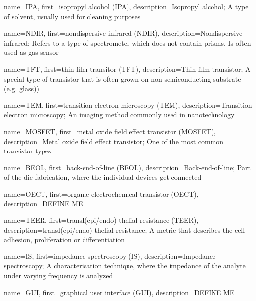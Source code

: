 {
    name={IPA},
    first={isopropyl alcohol (IPA)},
    description={Isopropyl alcohol; A type of solvent, usually used for cleaning purposes}
}

{
    name={NDIR},
    first={nondispersive infrared (NDIR)},
    description={Nondispersive infrared; Refers to a type of spectrometer which does not contain prisms. Is often used as gas sensor}
}

{
    name={TFT},
    first={thin film transitor (TFT)},
    description={Thin film transistor; A special type of transistor that is often grown on non-semiconducting substrate (e.g. glass))}
}

{
    name={TEM},
    first={transition electron microscopy (TEM)},
    description={Transition electron microscopy; An imaging method commonly used in nanotechnology}
}

{
    name={MOSFET},
    first={metal oxide field effect transistor (MOSFET)},
    description={Metal oxide field effect transistor; One of the most common transistor types}
}

{
    name={BEOL},
    first={back-end-of-line (BEOL)},
    description={Back-end-of-line; Part of the die fabrication, where the individual devices get connected}
}


{
    name={OECT},
    first={organic electrochemical transistor (OECT)},
    description={DEFINE ME}
}

{
    name={TEER},
    first={transI(epi/endo)-thelial resistance (TEER)},
    description={transI(epi/endo)-thelial resistance; A metric that describes the cell adhesion, proliferation or differentiation}
}

{
    name={IS},
    first={impedance spectroscopy (IS)},
    description={Impedance spectroscopy; A characterisation technique, where the impedance of the analyte under varying frequency is analyzed}
}

{
    name={GUI},
    first={graphical user interface (GUI)},
    description={DEFINE ME}
}